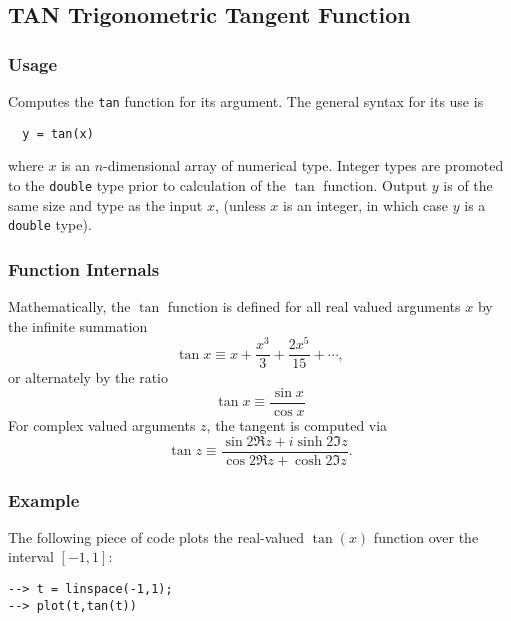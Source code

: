 %
%
%
\subsection{TAN Trigonometric Tangent Function}
\subsubsection{Usage}
Computes the \verb|tan| function for its argument.  The general
syntax for its use is
\begin{verbatim}
  y = tan(x)
\end{verbatim}
where $x$ is an $n$-dimensional array of numerical type.
Integer types are promoted to the \verb|double| type prior to
calculation of the $\tan$ function.  Output $y$ is of the
same size and type as the input $x$, (unless $x$ is an
integer, in which case $y$ is a \verb|double| type).  
\subsubsection{Function Internals}
Mathematically, the $\tan$ function is defined for all real
valued arguments $x$ by the infinite summation
\[
  \tan x \equiv x + \frac{x^3}{3} + \frac{2x^5}{15} + \cdots,
\]
or alternately by the ratio
\[
  \tan x \equiv \frac{\sin x}{\cos x}
\]
For complex valued arguments $z$, the tangent is computed via
\[
  \tan z \equiv \frac{\sin 2 \Re z + i \sinh 2 \Im z}
                     {\cos 2 \Re z + \cosh 2 \Im z}.
\]
\subsubsection{Example}
The following piece of code plots the real-valued $\tan(x)$
function over the interval $[-1,1]$:
\begin{verbatim}
--> t = linspace(-1,1);
--> plot(t,tan(t))
\end{verbatim}
